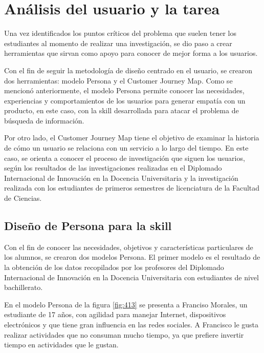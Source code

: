 
\section{Análisis del usuario y la tarea}
\label{AnalisisUsuariocapIV}

Una vez identificados los puntos críticos del problema que suelen tener los estudiantes al momento de realizar una investigación, se dio paso a crear herramientas que sirvan como apoyo para conocer de mejor forma a los usuarios.

Con el fin de seguir la metodología de diseño centrado en el usuario, se crearon dos herramientas: modelo Persona y el Customer Journey Map. Como se mencionó anteriormente, el modelo Persona permite conocer las necesidades, experiencias y comportamientos de los usuarios para generar empatía con un producto, en este caso, con la skill desarrollada para atacar el problema de búsqueda de información.

Por otro lado, el Customer Journey Map tiene el objetivo de examinar la historia de cómo un usuario se relaciona con un servicio a lo largo del tiempo. En este caso, se orienta a conocer el proceso de investigación que siguen los usuarios, según los resultados de las investigaciones realizadas en el Diplomado Internacional de Innovación en la Docencia Universitaria y la investigación realizada con los estudiantes de primeros semestres de licenciatura de la Facultad de Ciencias.


\subsection{Diseño de Persona para la skill}
\label{DisenioPersonacapIV}

Con el fin de conocer las necesidades, objetivos y características particulares de los alumnos, se crearon dos modelos Persona. El primer modelo es el resultado de la obtención de los datos recopilados por los profesores del Diplomado Internacional de Innovación en la Docencia Universitaria con estudiantes de nivel bachillerato.

En el modelo Persona de la figura \ref{fig:413} se presenta a Franciso Morales, un estudiante de 17 años, con agilidad para manejar Internet, dispositivos electrónicos y que tiene gran influencia en las redes sociales. A Francisco le gusta realizar actividades que no consuman mucho tiempo, ya que prefiere invertir tiempo en actividades que le gustan.

